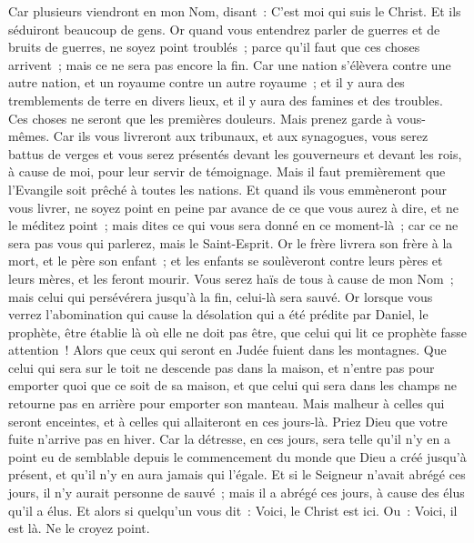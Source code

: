 \begin{multicols}{2}
Car plusieurs viendront en mon Nom, disant~: C'est moi qui suis le Christ. Et ils séduiront beaucoup de gens.
Or quand vous entendrez parler de guerres et de bruits de guerres, ne soyez point troublés~; parce qu'il faut que ces choses arrivent~; mais ce ne sera pas encore la fin.
Car une nation s'élèvera contre une autre nation, et un royaume contre un autre royaume~; et il y aura des tremblements de terre en divers lieux, et il y aura des famines et des troubles. Ces choses ne seront que les premières douleurs.
Mais prenez garde à vous-mêmes. Car ils vous livreront aux tribunaux, et aux synagogues, vous serez battus de verges et vous serez présentés devant les gouverneurs et devant les rois, à cause de moi, pour leur servir de témoignage.
Mais il faut premièrement que l'Evangile soit prêché à toutes les nations.
Et quand ils vous emmèneront pour vous livrer, ne soyez point en peine par avance de ce que vous aurez à dire, et ne le méditez point~; mais dites ce qui vous sera donné en ce moment-là~; car ce ne sera pas vous qui parlerez, mais le Saint-Esprit.
Or le frère livrera son frère à la mort, et le père son enfant~; et les enfants se soulèveront contre leurs pères et leurs mères, et les feront mourir.
Vous serez haïs de tous à cause de mon Nom~; mais celui qui persévérera jusqu'à la fin, celui-là sera sauvé.
Or lorsque vous verrez l'abomination qui cause la désolation qui a été prédite par Daniel, le prophète, être établie là où elle ne doit pas être, que celui qui lit ce prophète fasse attention~! Alors que ceux qui seront en Judée fuient dans les montagnes.
Que celui qui sera sur le toit ne descende pas dans la maison, et n'entre pas pour emporter quoi que ce soit de sa maison,
et que celui qui sera dans les champs ne retourne pas en arrière pour emporter son manteau.
Mais malheur à celles qui seront enceintes, et à celles qui allaiteront en ces jours-là.
Priez Dieu que votre fuite n'arrive pas en hiver.
Car la détresse, en ces jours, sera telle qu'il n'y en a point eu de semblable depuis le commencement du monde que Dieu a créé jusqu'à présent, et qu'il n'y en aura jamais qui l'égale.
Et si le Seigneur n'avait abrégé ces jours, il n'y aurait personne de sauvé~; mais il a abrégé ces jours, à cause des élus qu'il a élus.
Et alors si quelqu'un vous dit~: Voici, le Christ est ici. Ou~: Voici, il est là. Ne le croyez point.

\end{multicols}

